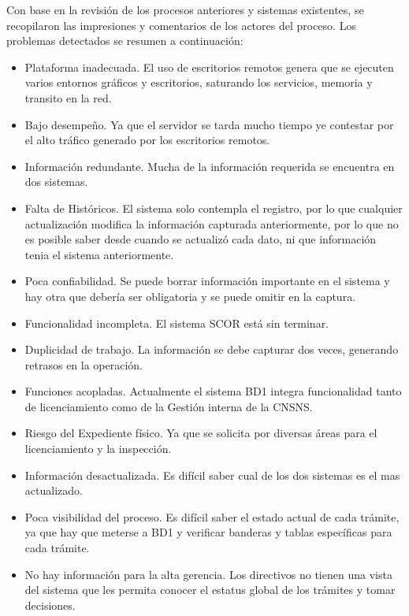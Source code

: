 \documentclass[10pt]{book}
\begin{document}
	Con base en la revisión de los procesos anteriores y sistemas existentes, se recopilaron las impresiones y comentarios de los actores del proceso. Los problemas detectados se resumen a continuación:
	
	\begin{itemize}
		\item Plataforma inadecuada. El uso de escritorios remotos genera que se ejecuten varios entornos gráficos y escritorios, saturando los servicios, memoria y transito en la red.
		\item Bajo desempeño. Ya que el servidor se tarda mucho tiempo ye contestar por el alto tráfico generado por los escritorios remotos.
		\item Información redundante. Mucha de la información requerida se encuentra en dos sistemas.
		\item Falta de Históricos. El sistema solo contempla el registro, por lo que cualquier actualización modifica la información capturada anteriormente, por lo que no es posible saber desde cuando se actualizó cada dato, ni que información tenia el sistema anteriormente.
		\item Poca confiabilidad. Se puede borrar información importante en el sistema  y hay otra que debería ser obligatoria y se puede omitir en la captura.
		\item Funcionalidad incompleta. El sistema SCOR está sin terminar.
		\item Duplicidad de trabajo. La información se debe capturar dos veces, generando retrasos en la operación.
		\item Funciones acopladas. Actualmente el sistema BD1 integra funcionalidad tanto de licenciamiento como de la Gestión interna de la CNSNS.
		\item Riesgo del Expediente físico. Ya que se solicita por diversas áreas para el licenciamiento y la inspección.
		\item Información desactualizada. Es difícil saber cual de los dos sistemas es el mas actualizado.
		\item Poca visibilidad del proceso. Es difícil saber el estado actual de cada trámite, ya que hay que meterse a BD1 y verificar banderas y tablas específicas para cada trámite.
		\item No hay información para la alta gerencia. Los directivos no tienen una vista del sistema que les permita conocer el estatus global de los trámites y tomar decisiones.
	\end{itemize}
\end{document}
